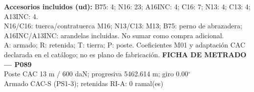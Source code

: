 \begingroup\scriptsize
\textbf{Accesorios incluidos (ud):} B75: 4; N16: 23; A16INC: 4; C16: 7; N13: 4; C13: 4; A13INC: 4.\\
N16/C16: tuerca/contratuerca M16; N13/C13: M13; B75: perno de abrazadera; A16INC/A13INC: arandelas incluidas. No sumar como compra adicional.\\
A: armado; R: retenida; T: tierra; P: poste. Coeficientes M01 y adaptación CAC declarada en el catálogo; no es plano de fabricación.
\endgroup\endgroup
\clearpage{}
\begingroup\small\setlength{\parskip}{3pt}\renewcommand{\arraystretch}{1.05}
\textbf{\large FICHA DE METRADO — P089}\\[4pt]
Poste CAC 13 m / 600 daN; progresiva 5462.614 m; giro 0.00\ensuremath{^\circ}\\
Armado CAC-S (PS1-3); retenidas RI-A: 0 ramal(es)\\
\begingroup\scriptsize
